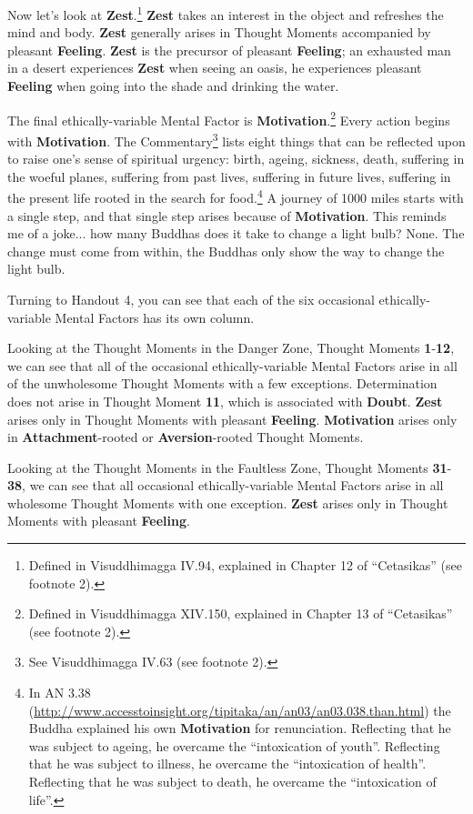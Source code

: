 Now let’s look at \textbf{Zest}.\footnote{Defined in Visuddhimagga IV.94, explained in Chapter 12 of “Cetasikas” (see footnote 2).} \textbf{Zest} takes an interest in the object and refreshes the mind and body. \textbf{Zest} generally arises in Thought Moments accompanied by pleasant \textbf{Feeling}. \textbf{Zest} is the precursor of pleasant \textbf{Feeling}; an exhausted man in a desert experiences \textbf{Zest} when seeing an oasis, he experiences pleasant \textbf{Feeling} when going into the shade and drinking the water.

The final ethically-variable Mental Factor is \textbf{Motivation}.\footnote{Defined in Visuddhimagga XIV.150, explained in Chapter 13 of “Cetasikas” (see footnote 2).} Every action begins with \textbf{Motivation}. The Commentary\footnote{See Visuddhimagga IV.63 (see footnote 2).} lists eight things that can be reflected upon to raise one’s sense of spiritual urgency: birth, ageing, sickness, death, suffering in the woeful planes, suffering from past lives, suffering in future lives, suffering in the present life rooted in the search for food.\footnote{In AN 3.38 (\url{http://www.accesstoinsight.org/tipitaka/an/an03/an03.038.than.html}) the Buddha explained his own \textbf{Motivation} for renunciation. Reflecting that he was subject to ageing, he overcame the “intoxication of youth”. Reflecting that he was subject to illness, he overcame the “intoxication of health”. Reflecting that he was subject to death, he overcame the “intoxication of life”.} A journey of 1000 miles starts with a single step, and that single step arises because of \textbf{Motivation}. This reminds me of a joke... how many Buddhas does it take to change a light bulb? None. The change must come from within, the Buddhas only show the way to change the light bulb.

Turning to Handout 4, you can see that each of the six occasional ethically-variable Mental Factors has its own column.

Looking at the Thought Moments in the Danger Zone, Thought Moments \textbf{1}-\textbf{12}, we can see that all of the occasional ethically-variable Mental Factors arise in all of the unwholesome Thought Moments with a few exceptions. Determination does not arise in Thought Moment \textbf{11}, which is associated with \textbf{Doubt}. \textbf{Zest} arises only in Thought Moments with pleasant \textbf{Feeling}. \textbf{Motivation} arises only in \textbf{Attachment}-rooted or \textbf{Aversion}-rooted Thought Moments.

Looking at the Thought Moments in the Faultless Zone, Thought Moments \textbf{31}-\textbf{38}, we can see that all occasional ethically-variable Mental Factors arise in all wholesome Thought Moments with one exception. \textbf{Zest} arises only in Thought Moments with pleasant \textbf{Feeling}.

